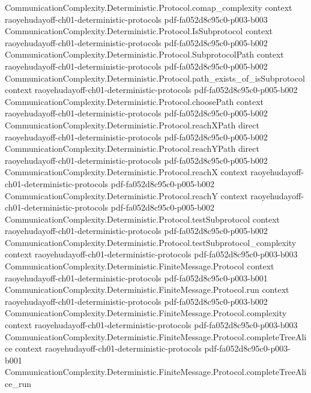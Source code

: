 \begin{theorem}
\proofstep
  {CommunicationComplexity.Deterministic.Protocol.comap_complexity}
  {context}
  {raoyehudayoff-ch01-deterministic-protocols}
  {pdf-fa052d8c95c0-p003-b003}
\proofstep
  {CommunicationComplexity.Deterministic.Protocol.IsSubprotocol}
  {context}
  {raoyehudayoff-ch01-deterministic-protocols}
  {pdf-fa052d8c95c0-p005-b002}
\proofstep
  {CommunicationComplexity.Deterministic.Protocol.SubprotocolPath}
  {context}
  {raoyehudayoff-ch01-deterministic-protocols}
  {pdf-fa052d8c95c0-p005-b002}
\proofstep
  {CommunicationComplexity.Deterministic.Protocol.path_exists_of_isSubprotocol}
  {context}
  {raoyehudayoff-ch01-deterministic-protocols}
  {pdf-fa052d8c95c0-p005-b002}
\proofstep
  {CommunicationComplexity.Deterministic.Protocol.choosePath}
  {context}
  {raoyehudayoff-ch01-deterministic-protocols}
  {pdf-fa052d8c95c0-p005-b002}
\proofstep
  {CommunicationComplexity.Deterministic.Protocol.reachXPath}
  {direct}
  {raoyehudayoff-ch01-deterministic-protocols}
  {pdf-fa052d8c95c0-p005-b002}
\proofstep
  {CommunicationComplexity.Deterministic.Protocol.reachYPath}
  {direct}
  {raoyehudayoff-ch01-deterministic-protocols}
  {pdf-fa052d8c95c0-p005-b002}
\proofstep
  {CommunicationComplexity.Deterministic.Protocol.reachX}
  {context}
  {raoyehudayoff-ch01-deterministic-protocols}
  {pdf-fa052d8c95c0-p005-b002}
\proofstep
  {CommunicationComplexity.Deterministic.Protocol.reachY}
  {context}
  {raoyehudayoff-ch01-deterministic-protocols}
  {pdf-fa052d8c95c0-p005-b002}
\proofstep
  {CommunicationComplexity.Deterministic.Protocol.testSubprotocol}
  {context}
  {raoyehudayoff-ch01-deterministic-protocols}
  {pdf-fa052d8c95c0-p005-b002}
\proofstep
  {CommunicationComplexity.Deterministic.Protocol.testSubprotocol_complexity}
  {context}
  {raoyehudayoff-ch01-deterministic-protocols}
  {pdf-fa052d8c95c0-p003-b003}
\proofstep
  {CommunicationComplexity.Deterministic.FiniteMessage.Protocol}
  {context}
  {raoyehudayoff-ch01-deterministic-protocols}
  {pdf-fa052d8c95c0-p003-b001}
\proofstep
  {CommunicationComplexity.Deterministic.FiniteMessage.Protocol.run}
  {context}
  {raoyehudayoff-ch01-deterministic-protocols}
  {pdf-fa052d8c95c0-p003-b002}
\proofstep
  {CommunicationComplexity.Deterministic.FiniteMessage.Protocol.complexity}
  {context}
  {raoyehudayoff-ch01-deterministic-protocols}
  {pdf-fa052d8c95c0-p003-b003}
\proofstep
  {CommunicationComplexity.Deterministic.FiniteMessage.Protocol.completeTreeAlice}
  {context}
  {raoyehudayoff-ch01-deterministic-protocols}
  {pdf-fa052d8c95c0-p003-b001}
\proofstep
  {CommunicationComplexity.Deterministic.FiniteMessage.Protocol.completeTreeAlice_run}

\end{theorem}

